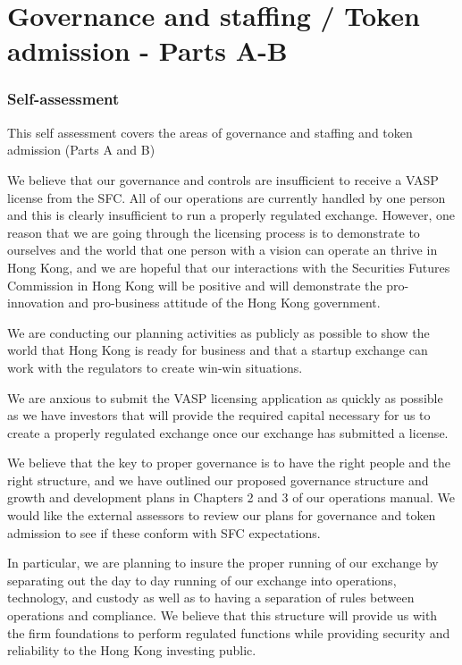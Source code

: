 \documentclass[]{report}
\begin{document}
\chapter{Governance and staffing / Token admission - Parts A-B}
\subsection{Self-assessment}
This self assessment covers the areas of governance and staffing and
token admission (Parts A and B)

We believe that our governance and controls are insufficient
to receive a VASP license from the SFC.  All of our operations are
currently handled by one person and this is clearly insufficient to
run a properly regulated exchange.  However, one reason that we are
going through the licensing process is to demonstrate to ourselves and
the world that one person with a vision can operate an thrive in Hong
Kong, and we are hopeful that our interactions with the Securities
Futures Commission in Hong Kong will be positive and will demonstrate
the pro-innovation and pro-business attitude of the Hong Kong
government.

We are conducting our planning activities as publicly as possible to
show the world that Hong Kong is ready for business and that a startup
exchange can work with the regulators to create win-win situations.

We are anxious to submit the VASP licensing application as quickly as
possible as we have investors that will provide the required capital
necessary for us to create a properly regulated exchange once our
exchange has submitted a license.

We believe that the key to proper governance is to have the right
people and the right structure, and we have outlined our proposed
governance structure and growth and development plans in Chapters 2
and 3 of our operations manual.  We would like the external assessors
to review our plans for governance and token admission to see if these
conform with SFC expectations.

In particular, we are planning to insure the proper running of our
exchange by separating out the day to day running of our exchange into
operations, technology, and custody as well as to having a separation
of rules between operations and compliance.  We believe that this
structure will provide us with the firm foundations to perform
regulated functions while providing security and reliability to the
Hong Kong investing public.
\end{document}
